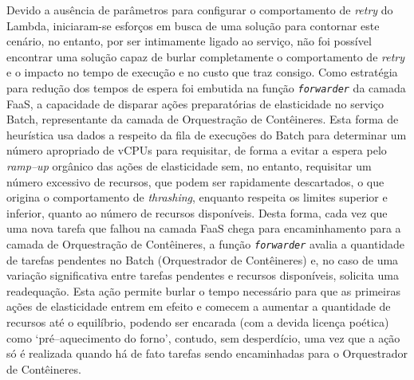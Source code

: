 \documentclass[english,brazilian]{UNISINOSmonografia} %
\begin{document}
Devido a ausência de parâmetros para configurar o comportamento de \textit{retry} do Lambda, iniciaram-se esforços em busca de uma solução para contornar este cenário, no entanto, por ser intimamente ligado ao serviço, não foi possível encontrar uma solução capaz de burlar completamente o comportamento de \textit{retry} e o impacto no tempo de execução e no custo que traz consigo.
%
Como estratégia para redução dos tempos de espera foi embutida na função \texttt{\textit{forwarder}} da camada FaaS, a capacidade de disparar ações preparatórias de elasticidade no serviço Batch, representante da camada de Orquestração de Contêineres.
%
Esta forma de heurística usa dados a respeito da fila de execuções do Batch para determinar um número apropriado de vCPUs para requisitar, de forma a evitar a espera pelo \textit{ramp--up} orgânico das ações de elasticidade sem, no entanto, requisitar um número excessivo de recursos, que podem ser rapidamente descartados, o que origina o comportamento de \textit{thrashing}, enquanto respeita os limites superior e inferior, quanto ao número de recursos disponíveis.
%
Desta forma, cada vez que uma nova tarefa que falhou na camada FaaS chega para encaminhamento para a camada de Orquestração de Contêineres, a função \texttt{\textit{forwarder}} avalia a quantidade de tarefas pendentes no Batch (Orquestrador de Contêineres) e, no caso de uma variação significativa entre tarefas pendentes e recursos disponíveis, solicita uma readequação.
%
Esta ação permite burlar o tempo necessário para que as primeiras ações de elasticidade entrem em efeito e comecem a aumentar a quantidade de recursos até o equilíbrio, podendo ser encarada (com a devida licença poética) como \textquoteleft pré--aquecimento do forno\textquoteright, contudo, sem desperdício, uma vez que a ação só é realizada quando há de fato tarefas sendo encaminhadas para o Orquestrador de Contêineres.
\end{document}

